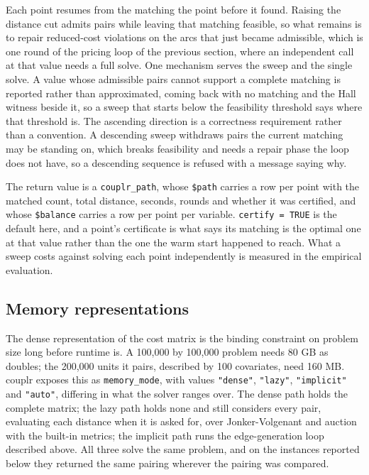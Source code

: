 Each point resumes from the matching the point before it found. Raising the
distance cut admits pairs while leaving that matching feasible, so what
remains is to repair reduced-cost violations on the arcs that just became
admissible, which is one round of the pricing loop of the previous section, where an
independent call at that value needs a full solve. One mechanism
serves the sweep and the single solve. A value whose admissible pairs cannot
support a complete matching is reported rather than approximated, coming back
with no matching and the Hall witness beside it, so a sweep that starts below
the feasibility threshold says where that threshold is. The ascending
direction is a correctness requirement rather than a convention. A descending sweep withdraws pairs the current matching may be standing on, which breaks
feasibility and needs a repair phase the loop does not have, so a descending
sequence is refused with a message saying why.

The return value is a \texttt{couplr\_path}, whose \texttt{\$path} carries a row per point
with the matched count, total distance, seconds, rounds and whether it was
certified, and whose \texttt{\$balance} carries a row per point per variable. \texttt{certify\ =\ TRUE} is the default here, and a point's certificate is what says its
matching is the optimal one at that value rather than the one the warm start
happened to reach. What a sweep costs against solving each point
independently is measured in the empirical evaluation.

\subsection{Memory representations}\label{memory-representations}

The dense representation of the cost matrix is the binding constraint on problem
size long before runtime is. A 100,000 by 100,000 problem needs 80 GB as doubles; the 200,000 units it
pairs, described by 100 covariates, need 160 MB. couplr exposes this as \texttt{memory\_mode}, with values \texttt{"dense"}, \texttt{"lazy"},
\texttt{"implicit"} and \texttt{"auto"}, differing in what the solver ranges over. The dense
path holds the complete matrix; the lazy path holds none and still considers
every pair, evaluating each distance when it is asked for, over Jonker-Volgenant and auction with the built-in metrics; the implicit path runs the
edge-generation loop described above. All three solve the same problem, and on
the instances reported below they returned the same pairing wherever the pairing
was compared.

